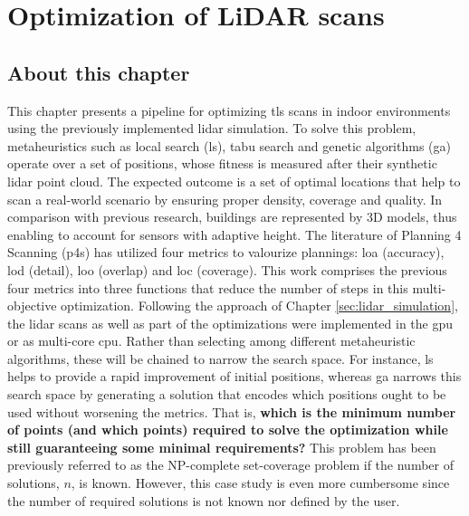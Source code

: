 \setchapterpreamble[u]{\margintoc}
\chapter{Optimization of LiDAR scans}
\label{sec:lidar_optimization}

\section*{About this chapter}

This chapter presents a pipeline for optimizing \acrshort{tls} scans in indoor environments using the previously implemented \acrshort{lidar} simulation. To solve this problem, metaheuristics such as local search (\acrshort{ls}), tabu search and genetic algorithms (\acrshort{ga}) operate over a set of positions, whose fitness is measured after their synthetic \acrshort{lidar} point cloud. The expected outcome is a set of optimal locations that help to scan a real-world scenario by ensuring proper density, coverage and quality. In comparison with previous research, buildings are represented by 3D models, thus enabling to account for sensors with adaptive height. The literature of Planning 4 Scanning (\acrshort{p4s}) has utilized four metrics to valourize plannings: \acrshort{loa} (accuracy), \acrshort{lod} (detail), \acrshort{loo} (overlap) and \acrshort{loc} (coverage). This work comprises the previous four metrics into three functions that reduce the number of steps in this multi-objective optimization. Following the approach of Chapter \ref{sec:lidar_simulation}, the \acrshort{lidar} scans as well as part of the optimizations were implemented in the \acrshort{gpu} or as multi-core \acrshort{cpu}. Rather than selecting among different metaheuristic algorithms, these will be chained to narrow the search space. For instance, \acrshort{ls} helps to provide a rapid improvement of initial positions, whereas \acrshort{ga} narrows this search space by generating a solution that encodes which positions ought to be used without worsening the metrics. That is, \textbf{which is the minimum number of points (and which points) required to solve the optimization while still guaranteeing some minimal requirements?} This problem has been previously referred to as the NP-complete set-coverage problem \cite{li_probability_2021, mohamadi_efficient_2021, roostapour_pareto_2022} if the number of solutions, $n$, is known. However, this case study is even more cumbersome since the number of required solutions is not known nor defined by the user. 

